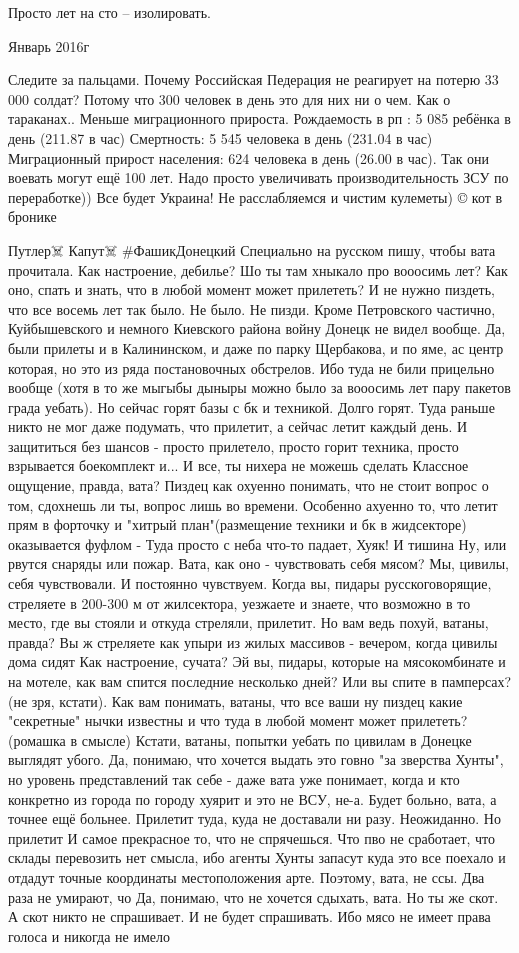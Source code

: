 Просто лет на сто – изолировать.

Январь 2016г

Следите за пальцами. Почему Российская Педерация не реагирует на потерю 33 000
солдат? Потому что 300 человек в день это для них ни о чем. Как о тараканах..
Меньше миграционного прироста. Рождаемость в рп : 5 085 ребёнка в день (211.87
в час) Смертность: 5 545 человека в день (231.04 в час) Миграционный прирост
населения: 624 человека в день (26.00 в час). Так они воевать могут ещё 100
лет. Надо просто увеличивать производительность ЗСУ по переработке)) Все будет
Украина! Не расслабляемся и чистим кулеметы) © кот в бронике

Путлер☠️ Капут☠️
#ФашикДонецкий Специально на русском пишу, чтобы вата прочитала.
Как настроение, дебилье? Шо ты там хныкало про вооосимь лет? Как оно, спать и знать, что в любой момент может прилететь?
И не нужно пиздеть, что все восемь лет так было. Не было. Не пизди. Кроме Петровского частично, Куйбышевского и немного Киевского района войну Донецк не видел вообще. Да, были прилеты и в Калининском, и даже по парку Щербакова, и по яме, ас центр которая, но это из ряда постановочных обстрелов. Ибо туда не били прицельно вообще (хотя в то же мыгыбы дыныры можно было за вооосимь лет пару пакетов града уебать).
Но сейчас горят базы с бк и техникой.
Долго горят.
Туда раньше никто не мог даже подумать, что прилетит, а сейчас летит каждый день.
И защититься без шансов - просто прилетело, просто горит техника, просто взрывается боекомплект и...
И все, ты нихера не можешь сделать
Классное ощущение, правда, вата? Пиздец как охуенно понимать, что не стоит вопрос о том, сдохнешь ли ты, вопрос лишь во времени. Особенно ахуенно то, что летит прям в форточку и "хитрый план"(размещение техники и бк в жидсекторе) оказывается фуфлом - Туда просто с неба что-то падает, Хуяк! И тишина
Ну, или рвутся снаряды или пожар.
Вата, как оно - чувствовать себя мясом?
Мы, цивилы, себя чувствовали. И постоянно чувствуем.
Когда вы, пидары русскоговорящие, стреляете в 200-300 м от жилсектора, уезжаете и знаете, что возможно в то место, где вы стояли и откуда стреляли, прилетит.
Но вам ведь похуй, ватаны, правда?
Вы ж стреляете как упыри из жилых массивов - вечером, когда цивилы дома сидят
Как настроение, сучата? Эй вы, пидары, которые на мясокомбинате и на мотеле, как вам спится последние несколько дней?
Или вы спите в памперсах?(не зря, кстати). Как вам понимать, ватаны, что все ваши ну пиздец какие "секретные" нычки известны и что туда в любой момент может прилететь?(ромашка в смысле)
Кстати, ватаны, попытки уебать по цивилам в Донецке выглядят убого. Да, понимаю, что хочется выдать это говно "за зверства Хунты", но уровень представлений так себе - даже вата уже понимает, когда и кто конкретно из города по городу хуярит и это не ВСУ, не-а.
Будет больно, вата, а точнее ещё больнее. Прилетит туда, куда не доставали ни разу. Неожиданно. Но прилетит
И самое прекрасное то, что не спрячешься. Что пво не сработает, что склады перевозить нет смысла, ибо агенты Хунты запасут куда это все поехало и отдадут точные координаты местоположения арте. Поэтому, вата, не ссы. Два раза не умирают, чо
Да, понимаю, что не хочется сдыхать, вата. Но ты же скот. А скот никто не спрашивает. И не будет спрашивать. Ибо мясо не имеет права голоса и никогда не имело

